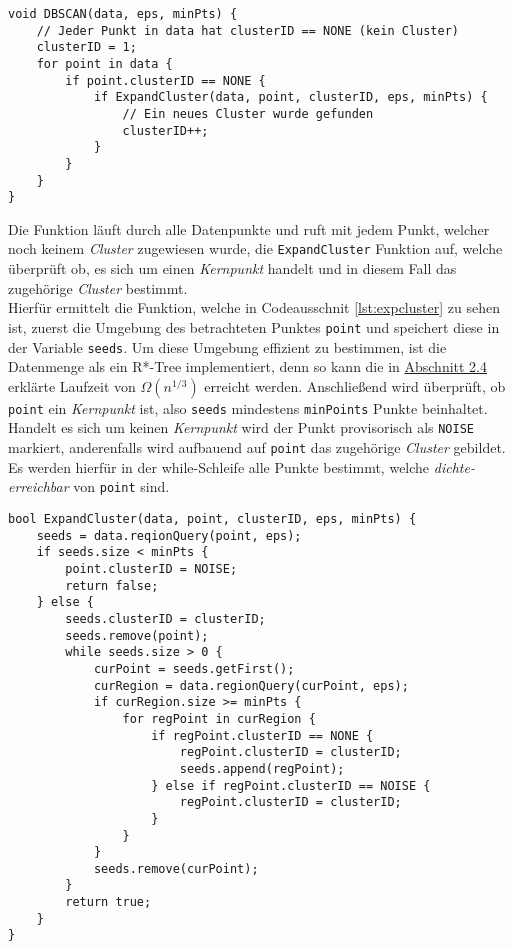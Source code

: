 \documentclass{lni}
\begin{document}

\begin{lstlisting}[caption={DBSCAN},label={lst:dbscan}]
void DBSCAN(data, eps, minPts) {
    // Jeder Punkt in data hat clusterID == NONE (kein Cluster)
    clusterID = 1;
    for point in data {
        if point.clusterID == NONE {
            if ExpandCluster(data, point, clusterID, eps, minPts) {
                // Ein neues Cluster wurde gefunden
                clusterID++;
            }
        }
    }
}
\end{lstlisting}


Die Funktion läuft durch alle Datenpunkte und ruft mit jedem Punkt, welcher noch keinem \textit{Cluster} zugewiesen wurde, die \lstinline{ExpandCluster} Funktion auf, welche überprüft ob, es sich um einen \textit{Kernpunkt} handelt und in diesem Fall das zugehörige \textit{Cluster} bestimmt.\\
Hierfür ermittelt die Funktion, welche in Codeausschnit \ref{lst:expcluster} zu sehen ist, zuerst die Umgebung des betrachteten Punktes \lstinline{point} und speichert diese in der Variable \lstinline{seeds}.
Um diese Umgebung effizient zu bestimmen, ist die Datenmenge als ein R*-Tree implementiert, denn so kann die in \hyperref[sec:rtree]{Abschnitt 2.4} erklärte Laufzeit von $\Omega(n^{1/3})$ erreicht werden. Anschließend wird überprüft, ob \lstinline{point} ein \textit{Kernpunkt} ist, also \lstinline{seeds} mindestens \lstinline{minPoints} Punkte beinhaltet. Handelt es sich um keinen \textit{Kernpunkt} wird der Punkt provisorisch als \lstinline{NOISE} markiert, anderenfalls wird aufbauend auf \lstinline{point} das zugehörige \textit{Cluster} gebildet. Es werden hierfür in der while-Schleife alle Punkte bestimmt, welche \textit{dichte-erreichbar} von \lstinline{point} sind.


\newpage

\begin{lstlisting}[caption={ExpandCluster},label={lst:expcluster}]
bool ExpandCluster(data, point, clusterID, eps, minPts) {
    seeds = data.reqionQuery(point, eps);
    if seeds.size < minPts {
        point.clusterID = NOISE;
        return false;
    } else {
        seeds.clusterID = clusterID;
        seeds.remove(point);
        while seeds.size > 0 {
            curPoint = seeds.getFirst();
            curRegion = data.regionQuery(curPoint, eps);
            if curRegion.size >= minPts {
                for regPoint in curRegion {
                    if regPoint.clusterID == NONE {
                        regPoint.clusterID = clusterID;
                        seeds.append(regPoint);
                    } else if regPoint.clusterID == NOISE {
                        regPoint.clusterID = clusterID;
                    }
                }
            }
            seeds.remove(curPoint);
        }
        return true;
    }
}
\end{lstlisting}
\end{document}

